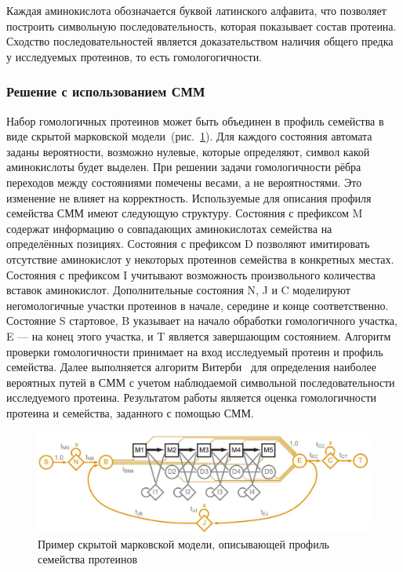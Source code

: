 Каждая аминокислота обозначается буквой латинского алфавита, что позволяет 
построить символьную последовательность, которая показывает состав протеина.
Сходство последовательностей является доказательством наличия общего предка у 
исследуемых протеинов, то есть гомологогичности.

\subsubsection{Решение с использованием СММ}
\label{HMM_solution}
Набор гомологичных протеинов может быть объединен в профиль семейства в виде 
скрытой марковской модели~\cite{HMM_Eddy}(рис.~\ref{HMM_example}).
Для каждого состояния автомата заданы вероятности, возможно нулевые, которые 
определяют, символ какой аминокислоты будет выделен.
При решении задачи гомологичности рёбра переходов между состояниями помечены
весами, а не вероятностями.
Это изменение не влияет на корректность.
Используемые для описания профиля семейства СММ имеют следующую структуру.
Состояния с префиксом M содержат информацию о совпадающих аминокислотах 
семейства на определённых позициях.
Состояния с префиксом D позволяют имитировать отсутствие аминокислот у 
некоторых протеинов семейства в конкретных местах.
Состояния с префиксом I учитывают возможность произвольного количества 
вставок аминокислот.
Дополнительные состояния N, J и C моделируют негомологичные участки протеинов в 
начале, середине и конце соответственно.
Состояние S стартовое, B указывает на начало обработки гомологичного участка, E --- на конец этого участка, и T является завершающим состоянием.
Алгоритм проверки гомологичности принимает на вход исследуемый протеин и 
профиль семейства.
Далее выполняется алгоритм Витерби~\cite{Viterbi} для определения наиболее 
вероятных путей в СММ с учетом наблюдаемой символьной последовательности 
исследуемого протеина.
Результатом работы является оценка гомологичности протеина и 
семейства, заданного с помощью СММ.

\begin{figure}
  \centering
  \includegraphics[width=\columnwidth]{HMM.png}
  \caption{Пример скрытой марковской модели, описывающей профиль семейства
   протеинов~\cite{MSV_Eddy}}
  \label{HMM_example}
\end{figure}

